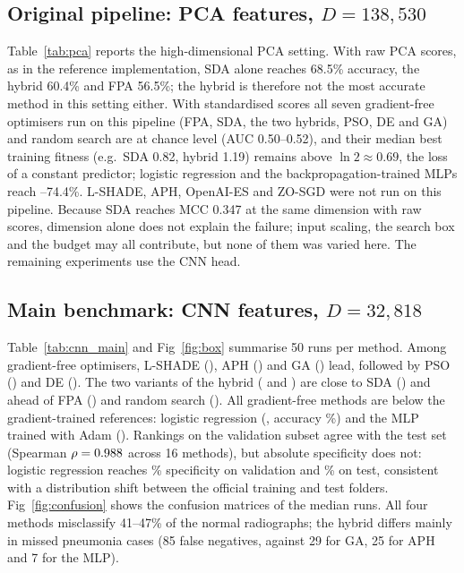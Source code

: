 \documentclass[10pt,letterpaper]{article}
\begin{document}
\subsection{Original pipeline: PCA features, \texorpdfstring{$D=138{,}530$}{D = 138,530}}\label{sec:pca}
Table~\ref{tab:pca} reports the high-dimensional PCA setting. With raw PCA scores, as in the reference implementation, SDA alone reaches 68.5\% accuracy, the hybrid 60.4\% and FPA 56.5\%; the hybrid is therefore not the most accurate method in this setting either. With standardised scores all seven gradient-free optimisers run on this pipeline (FPA, SDA, the two hybrids, PSO, DE and GA) and random search are at chance level (AUC 0.50--0.52), and their median best training fitness (e.g.\ SDA 0.82, hybrid 1.19) remains above $\ln 2\approx0.69$, the loss of a constant predictor; logistic regression and the backpropagation-trained MLPs reach \MlpSgdPcaAcc--74.4\%. L-SHADE, APH, OpenAI-ES and ZO-SGD were not run on this pipeline. Because SDA reaches MCC 0.347 at the same dimension with raw scores, dimension alone does not explain the failure; input scaling, the search box and the budget may all contribute, but none of them was varied here. The remaining experiments use the CNN head.



\subsection{Main benchmark: CNN features, \texorpdfstring{$D=32{,}818$}{D = 32,818}}
Table~\ref{tab:cnn_main} and Fig~\ref{fig:box} summarise 50 runs per method. Among gradient-free optimisers, L-SHADE (\MCCLShade), APH (\MCCAph) and GA (\MCCGa) lead, followed by PSO (\MCCPso) and DE (\MCCDe). The two variants of the hybrid (\MCCHybrid{} and \MCCHybridReinit) are close to SDA (\MCCSda) and ahead of FPA (\MCCFpa) and random search (\MCCRandom). All gradient-free methods are below the gradient-trained references: logistic regression (\MCCLogreg, accuracy \ACCLogreg\%) and the MLP trained with Adam (\MCCMlpAdam). Rankings on the validation subset agree with the test set (Spearman $\rho=0.988$ across 16 methods), but absolute specificity does not: logistic regression reaches \LRValSpec\% specificity on validation and \LRTestSpec\% on test, consistent with a distribution shift between the official training and test folders. Fig~\ref{fig:confusion} shows the confusion matrices of the median runs. All four methods misclassify 41--47\% of the normal radiographs; the hybrid differs mainly in missed pneumonia cases (85 false negatives, against 29 for GA, 25 for APH and 7 for the MLP).
\end{document}
